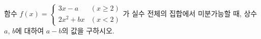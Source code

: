 함수 $f(x)=\begin{cases} 3x-a & (x\ge 2) \\ 2x^2+bx & (x<2) \end{cases}$가 실수 전체의 집합에서 미분가능할 때, 상수 $a$, $b$에 대하여 $a-b$의 값을 구하시오.
